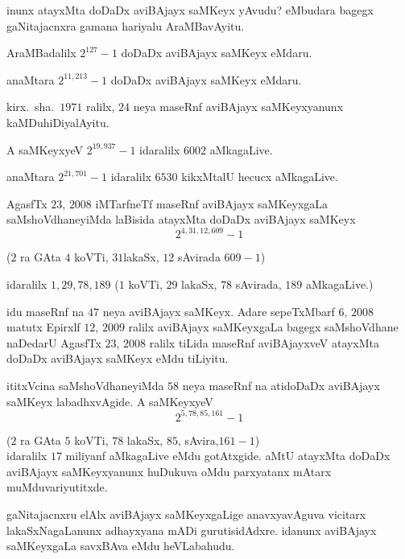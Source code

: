 inunx atayxMta doDaDx aviBAjayx saMKeyx yAvudu? eMbudara bagegx gaNitajacnxra gamana hariyalu AraMBavAyitu.

AraMBadalilx $2^{127}-1$ doDaDx aviBAjayx saMKeyx eMdaru.

anaMtara $2^{11,213}-1$ doDaDx aviBAjayx saMKeyx eMdaru.

kirx.~sha.\ $1971$ ralilx, $24$ neya maseRnf aviBAjayx saMKeyxyanunx kaMDuhiDiya\-lAyitu.

A saMKeyxyeV $2^{19,937}-1$ idaralilx $6002$ aMkagaLive.

anaMtara $2^{21,701}-1$ idaralilx $6530$ kikxMtalU hecucx aMkagaLive.

AgasfTx $23$, $2008$ iMTarfneTf maseRnf aviBAjayx saMKeyxgaLa \-saMshoVdhaneyiMda laBisida atayxMta doDaDx aviBAjayx saMKeyx
$$ 
2^{4,31,12,609}-1
$$

($2$ ra GAta $4$ koVTi, $31$lakaSx, $12$ sAvirada $609-1$)

idaralilx $1,29,78,189$ ($1$ koVTi, $29$ lakaSx, $78$ sAvirada, $189$ aMkagaLive.)

idu maseRnf na $47$ neya aviBAjayx saMKeyx. Adare sepeTxMbarf $6$, $2008$ matutx Epirxlf $12$, $2009$ ralilx aviBAjayx saMKeyxgaLa bagegx saMshoVdhane naDedarU AgasfTx $23$, $2008$ ralilx tiLida maseRnf aviBAjayxveV atayxMta doDaDx aviBAjayx saMKeyx eMdu tiLiyitu. 

\newpage

ititxVcina saMshoVdhaneyiMda $58$ neya maseRnf na atidoDaDx aviBAjayx saMKeyx labadhxvAgide. A saMKeyxyeV 
$$
2^{5,78,85,161}-1
$$

($2$ ra GAta $5$ koVTi, $78$ lakaSx, $85$, sAvira,$161 - 1$)\\
idaralilx $17$ miliyanf aMkagaLive eMdu gotAtxgide. aMtU atayxMta doDaDx aviBAjayx saMKeyxyanunx huDukuva oMdu parxyatanx mAtarx muMduvariyutitxde.

gaNitajacnxru elAlx aviBAjayx saMKeyxgaLige anavxyavAguva vicitarx lakaSxNagaLanunx adhayxyana mADi gurutisidAdxre. idanunx aviBAjayx saMKeyxgaLa savxBAva eMdu heVLa\-bahudu.

